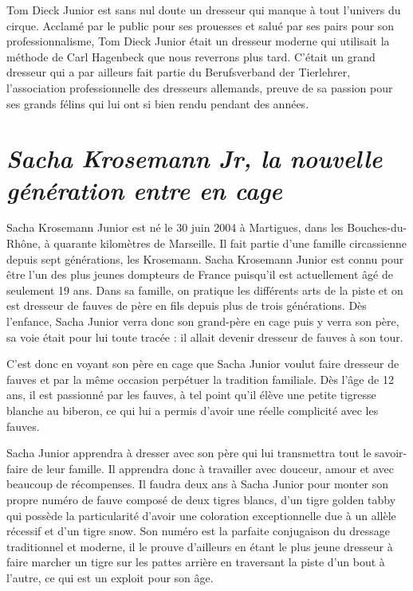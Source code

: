 Tom Dieck Junior est sans nul doute un dresseur qui manque à tout l'univers du cirque. Acclamé par le public pour ses prouesses et salué par ses pairs pour son professionnalisme, Tom Dieck Junior était un dresseur moderne qui utilisait la méthode de Carl Hagenbeck que nous reverrons plus tard. C'était un grand dresseur qui a par ailleurs fait partie du Berufsverband der Tierlehrer, l'association professionnelle des dresseurs allemands, preuve de sa passion pour ses grands félins qui lui ont si bien rendu pendant des années.

\section*{\textit{Sacha Krosemann Jr, la nouvelle génération entre en cage}}
{}

Sacha Krosemann Junior est né le 30 juin 2004 à Martigues, dans les Bouches-du-Rhône, à quarante kilomètres de Marseille. Il fait partie d'une famille circassienne depuis sept générations, les Krosemann. Sacha Krosemann Junior est connu pour être l'un des plus jeunes dompteurs de France puisqu'il est actuellement âgé de seulement 19 ans. Dans sa famille, on pratique les différents arts de la piste et on est dresseur de fauves de père en fils depuis plus de trois générations. Dès l'enfance, Sacha Junior verra donc son grand-père en cage puis y verra son père, sa voie était pour lui toute tracée : il allait devenir dresseur de fauves à son tour.

C'est donc en voyant son père en cage que Sacha Junior voulut faire dresseur de fauves et par la même occasion perpétuer la tradition familiale. Dès l'âge de 12 ans, il est passionné par les fauves, à tel point qu'il élève une petite tigresse blanche au biberon, ce qui lui a permis d'avoir une réelle complicité avec les fauves.

Sacha Junior apprendra à dresser avec son père qui lui transmettra tout le savoir-faire de leur famille. Il apprendra donc à travailler avec douceur, amour et avec beaucoup de récompenses. Il faudra deux ans à Sacha Junior pour monter son propre numéro de fauve composé de deux tigres blancs, d'un tigre golden tabby qui possède la particularité d'avoir une coloration exceptionnelle due à un allèle récessif et d'un tigre snow. Son numéro est la parfaite conjugaison du dressage traditionnel et moderne, il le prouve d'ailleurs en étant le plus jeune dresseur à faire marcher un tigre sur les pattes arrière en traversant la piste d'un bout à l'autre, ce qui est un exploit pour son âge.

